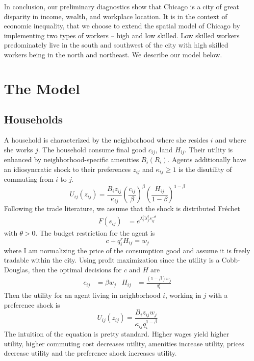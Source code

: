\documentclass[12pt]{article}
\begin{document}
In conclusion, our preliminary diagnostics show that Chicago is a city of great disparity in income, wealth, and workplace location.  It is in the context of economic inequality, that we choose to extend the spatial model of Chicago by implementing two types of workers -- high and low skilled. Low skilled workers predominately live in the south and southwest of the city with high skilled workers being in the north and northeast. We describe our model below. 
\clearpage
\section{The Model}
\subsection{Households}
A household is characterized by the neighborhood where she resides $i$ and where she works $j$. The household consume final good $c_{ij}$, land $H_{ij}$. Their utility is enhanced by neighborhood-specific amenities $B_i(R_i)$. Agents additionally have an idiosyncratic shock to their preferences $z_{ij}$ and $\kappa_{ij}\geq 1$ is the disutility of commuting from $i$ to $j$.  \\ 
\begin{equation}
    U_{ij}(z_{ij}) = \frac{B_iz_{ij}}{\kappa_{ij}}\left(\frac{c_{ij}}{\beta}\right)^{\beta}\left(\frac{H_{ij}}{1-\beta}\right)^{1-\beta}
\end{equation}
Following the trade literature, we assume that the shock is distributed Fréchet 
\begin{align*}
    F(s_{ij}) &= e^{\lambda^o_{i}\lambda^d_js_{ij}^{-\theta}}
\end{align*}
with $\theta>0$. 
The budget restriction for the agent is 
\begin{equation*}
    c + q_i^{r}H_{ij} = w_j
\end{equation*}
where I am normalizing the price of the consumption good and assume it is freely tradable within the city. Using profit maximization since the utility is a Cobb-Douglas, then the optimal decisions for $c$ and $H$ are  
\begin{align*}
    c_{ij} &= \beta w_j & H_{ij}&= \boxed{ \frac{(1-\beta)w_j}{q_i^{r}}}
\end{align*}
Then the utility for an agent living in neighborhood $i$, working in $j$ with a preference shock is 
\begin{equation}
    U_{ij}(z_{ij}) = \frac{B_iz_{ij}w_j}{\kappa_{ij}q_{i}^{1-\beta}}
\end{equation}
The intuition of the equation is pretty standard. Higher wages yield higher utility, higher commuting cost decreases utility, amenities increase utility, prices decrease utility and the preference shock increases utility. 
\end{document}
